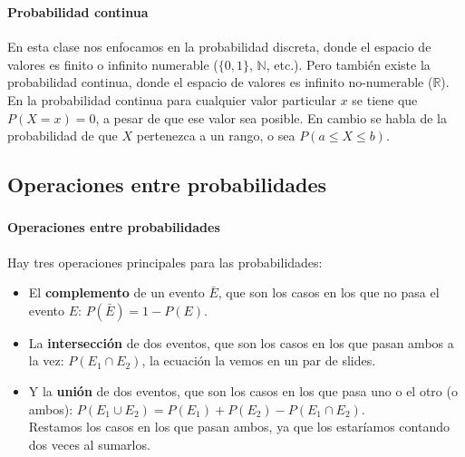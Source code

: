 \documentclass[../main.tex]{subfiles}
\begin{document}
\begin{frame}
  \frametitle{\SECTIONA}
  \framesubtitle{Probabilidad continua}
  
  En esta clase nos enfocamos en la probabilidad discreta, donde el espacio de valores es finito o infinito numerable (\(\{0, 1\}\), \(\mathbb{N}\), etc.). Pero también existe la probabilidad continua, donde el espacio de valores es infinito no-numerable (\(\mathbb{R}\)). \pause \\
  En la probabilidad continua para cualquier valor particular \(x\) se tiene que \(P(X = x) = 0\), a pesar de que ese valor sea posible. \pause En cambio se habla de la probabilidad de que \(X\) pertenezca a un rango, o sea \(P(a \leq X \leq b)\).
\end{frame}

\subsection{Operaciones entre probabilidades}

\begin{frame}
  \frametitle{\SECTIONA}
  \framesubtitle{Operaciones entre probabilidades}

  Hay tres operaciones principales para las probabilidades:
  \begin{itemize}
    \item<2-> El \textbf{complemento} de un evento \(\bar{E}\), que son los casos en los que no pasa el evento \(E\): \(P(\bar{E}) = 1 - P(E)\).
    \item<3-> La \textbf{intersección} de dos eventos, que son los casos en los que pasan ambos a la vez: \(P(E_{1} \cap E_{2})\), la ecuación la vemos en un par de slides.
    \item<4-> Y la \textbf{unión} de dos eventos, que son los casos en los que pasa uno o el otro (o ambos): \(P(E_{1} \cup E_{2}) = P(E_{1}) + P(E_{2}) - P(E_{1} \cap E_{2})\). \pause \\
      Restamos los casos en los que pasan ambos, ya que los estaríamos contando dos veces al sumarlos.
  \end{itemize}
\end{frame}
\end{document}
